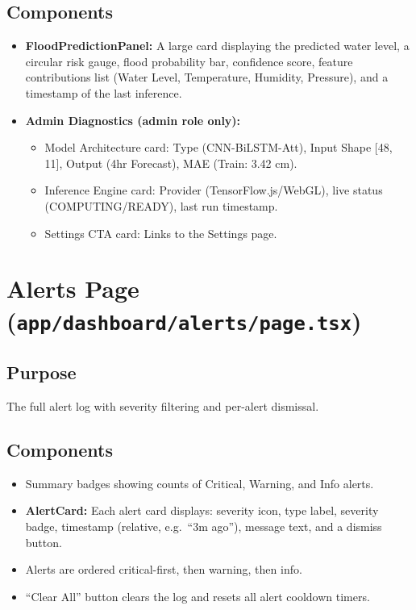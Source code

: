 \subsection{Components}
\begin{itemize}[leftmargin=1.5em]
  \item \textbf{FloodPredictionPanel:} A large card displaying the predicted water level, a circular risk gauge, flood probability bar, confidence score, feature contributions list (Water Level, Temperature, Humidity, Pressure), and a timestamp of the last inference.
  \item \textbf{Admin Diagnostics (admin role only):}
    \begin{itemize}
      \item Model Architecture card: Type (CNN-BiLSTM-Att), Input Shape [48, 11], Output (4hr Forecast), MAE (Train: 3.42 cm).
      \item Inference Engine card: Provider (TensorFlow.js/WebGL), live status (COMPUTING/READY), last run timestamp.
      \item Settings CTA card: Links to the Settings page.
    \end{itemize}
\end{itemize}

\section{Alerts Page (\texttt{app/\allowbreak{}dashboard/\allowbreak{}alerts/\allowbreak{}page.\allowbreak{}tsx})}

\subsection{Purpose}
The full alert log with severity filtering and per-alert dismissal.

\subsection{Components}
\begin{itemize}[leftmargin=1.5em]
  \item Summary badges showing counts of Critical, Warning, and Info alerts.
  \item \textbf{AlertCard:} Each alert card displays: severity icon, type label, severity badge, timestamp (relative, e.g.\ ``3m ago''), message text, and a dismiss button.
  \item Alerts are ordered critical-first, then warning, then info.
  \item ``Clear All'' button clears the log and resets all alert cooldown timers.
\end{itemize}


